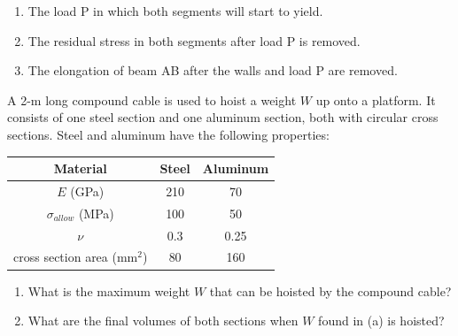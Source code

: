 \documentclass[
10pt,
a4paper,
openany,
svgnames,
]{book} %
\newcommand{\exercise}{%
\item\label{lab:\arabic{chapter}.\arabic{exercisesi}}  %
}
\begin{document}
\begin{exercises}
  \begin{enumerate}
  \item The load P in which both segments will start to yield.
  \item The residual stress in both segments after load P is removed.
  \item The elongation of beam AB after the walls and load P are removed.
  \end{enumerate}

  \exercise A 2-m long compound cable is used to hoist a weight $W$ up onto a platform. It consists of one steel section and one aluminum section, both with circular cross sections. Steel and aluminum have the following properties: 

  \begin{table}[H]
    \centering
    \begin{tabular}{  c c c }
      \toprule
      Material & Steel & Aluminum \\
      \midrule
      $E$ (GPa) & 210 & 70 \\
      $\sigma_{allow}$ (MPa) & 100 & 50 \\
      $\nu$	&	0.3	&	0.25 \\
      cross section area (mm$^2$) & 80 & 160 \\
      \bottomrule
    \end{tabular}
  \end{table}

  \begin{figure}[H]
    \centering
  \end{figure}
  
  \begin{enumerate}
  \item What is the maximum weight $W$ that can be hoisted by the compound cable?
  \item What are the final volumes of both sections when $W$ found in (a) is hoisted?
  \end{enumerate}


\end{exercises}
\end{document}
